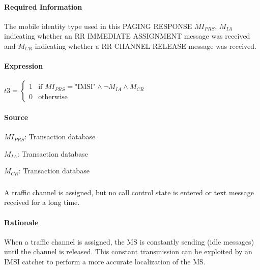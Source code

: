 \documentclass[a4paper,11pt,notitlepage,bigheadings,oneside]{scrartcl}
\begin{document}
\paragraph{Required Information}

The mobile identity type used in this PAGING RESPONSE $MI_{PRS}$, $M_{IA}$
indicating whether an RR IMMEDIATE ASSIGNMENT message was received and $M_{CR}$
indicating whether a RR CHANNEL RELEASE message was received.

\paragraph{Expression}

$t3 =
\begin{cases}
	1 & \text{if } MI_{PRS} = \text{"IMSI"} \wedge \neg M_{IA} \wedge M_{CR} \\
	0 & \text{otherwise}
\end{cases}$


\paragraph{Source}

$MI_{PRS}$: Transaction database


$M_{IA}$: Transaction database


$M_{CR}$: Transaction database


\subsubsection{}

A traffic channel is assigned, but no call control state is entered or text
message received for a long time.

\paragraph{Rationale}

When a traffic channel is assigned, the MS is constantly sending (idle
messages) until the channel is released. This constant transmission can be
exploited by an IMSI catcher to perform a more accurate localization of the MS.
\end{document}

